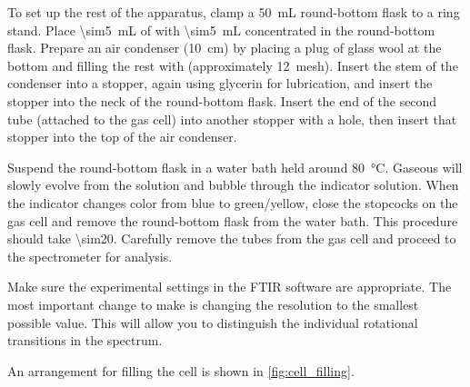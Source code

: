 \documentclass[nobib,nofonts,nols,nohyper]{tufte-handout}
\begin{document}
To set up the rest of the apparatus, clamp a \SI{50}{\mL} round-bottom flask to a ring stand. 
Place \SI{\sim5}{\mL} of  with \SI{\sim5}{\mL} concentrated  in the round-bottom flask.
Prepare an air condenser (\SI{10}{\cm}) by placing a plug of glass wool at the bottom and filling the rest with  (approximately \SI{12}{mesh}). 
Insert the stem of the condenser into a stopper, again using glycerin for lubrication, and insert the stopper into the neck of the round-bottom flask. 
Insert the end of the second tube (attached to the gas cell) into another stopper with a hole, then insert that stopper into the top of the air condenser. 
%

Suspend the round-bottom flask in a water bath held around \SI{80}{\celsius}. 
Gaseous  will slowly evolve from the solution and bubble through the indicator solution. 
When the indicator changes color from blue to green/yellow, close the stopcocks on the gas cell and remove the round-bottom flask from the water bath. 
This procedure should take \SI{\sim20}{\min}. 
Carefully remove the tubes from the gas cell and proceed to the spectrometer for analysis. 

Make sure the experimental settings in the FTIR software are appropriate. 
The most important change to make is changing the resolution to the smallest possible value. 
This will allow you to distinguish the individual rotational transitions in the spectrum. 

An arrangement for filling the cell is shown in \cref{fig:cell_filling}.
\end{document}
